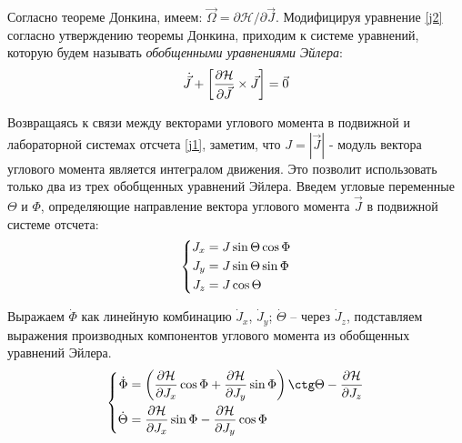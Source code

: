 Согласно теореме Донкина, имеем: $\vec{\Omega} = \partial \mathcal{H} / \partial \vec{J}$. Модифицируя уравнение \eqref{j2} согласно утверждению теоремы Донкина, приходим к системе уравнений, которую будем называть \textit{обобщенными уравнениями Эйлера}:
\vverh
\begin{gather}
\dot{\vec{J}} + \left[ \frac{\partial \mathcal{H}}{\partial \vec{J}} \times \vec{J} \right] = \vec{0} \notag
\end{gather}

Возвращаясь к связи между векторами углового момента в подвижной и лабораторной системах отсчета \eqref{j1}, заметим, что $J = | \vec{J} |$ - модуль вектора углового момента является интегралом движения. Это позволит использовать только два из трех обобщенных уравнений Эйлера. Введем угловые переменные $\Theta$ и $\Phi$, определяющие направление вектора углового момента $\vec{J}$ в подвижной системе отсчета:
\vverh
\begin{gather}
\left\{
\begin{aligned}
J_x &= J \sin \Theta \cos \Phi \\
J_y &= J \sin \Theta \sin \Phi \\
J_z &= J \cos \Theta
\end{aligned}
\right. \notag
\end{gather}

Выражаем $\dot{\Phi}$ как линейную комбинацию $\dot{J}_x$, $\dot{J}_y$; $\dot{\Theta}$ -- через $\dot{J}_z$, подставляем выражения производных компонентов углового момента из обобщенных уравнений Эйлера. 
\vverh
\begin{gather}
\left\{
\begin{aligned}
\dot{\Phi} &= \lb \frac{\partial \mathcal{H}}{\partial J_x} \cos \Phi + \frac{\partial \mathcal{H}}{\partial J_y} \sin \Phi \rb \ctg \Theta - \frac{\partial \mathcal{H}}{\partial J_z} \\
\dot{\Theta} &= \frac{\partial \mathcal{H}}{\partial J_x} \sin \Phi - \frac{\partial \mathcal{H}}{\partial J_y} \cos \Phi 
\end{aligned}
\right. \notag
\end{gather}

